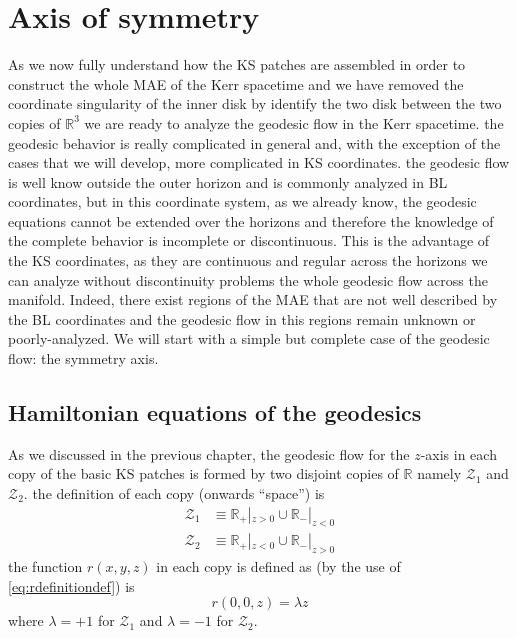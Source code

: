 \chapter{Axis of symmetry}\label{ch:dinamicsys} %

As we now fully understand how the \gls{KS} patches are assembled in order to construct the whole \gls{MAE} of the Kerr spacetime and we have removed the coordinate singularity of the inner disk by identify the two disk between the two copies of $\mathbb{R}^3$ we are ready to analyze the geodesic flow in the Kerr spacetime. the geodesic behavior is really complicated in general and, with the exception of the cases that we will develop, more complicated in \gls{KS} coordinates. the geodesic flow is well know outside the outer horizon and is commonly analyzed in \gls{BL} coordinates, but in this coordinate system, as we already know, the geodesic equations cannot be extended over the horizons and therefore the knowledge of the complete behavior is incomplete or discontinuous. This is the advantage of the \gls{KS} coordinates, as they are continuous and regular across the horizons we can analyze without discontinuity problems the whole geodesic flow across the manifold. Indeed, there exist regions of the \gls{MAE} that are not well described by the \gls{BL} coordinates and the geodesic flow in this regions remain unknown or poorly-analyzed. We will start with a simple but complete case of the geodesic flow: the symmetry axis.

\section{Hamiltonian equations of the geodesics}\label{Hamiltonianbon}

As we discussed in the previous chapter, the geodesic flow for the $z$-axis in each copy of the basic \gls{KS} patches is formed by two disjoint copies of $\mathbb{R}$ namely $\mathcal{Z}_1$ and $\mathcal{Z}_2$. the definition of each copy (onwards ``space'') is
\begin{align}
 \mathcal{Z}_1 &\equiv \mathbb{R}_+|_{z>0} \cup \mathbb{R}_-|_{z<0}\\
  \mathcal{Z}_2 &\equiv \mathbb{R}_+|_{z<0} \cup \mathbb{R}_-|_{z>0}
\end{align}
the function $r(x,y,z)$ in each copy is defined as (by the use of \cref{eq:rdefinitiondef}) is
\begin{equation}
 r(0,0,z)= \lambda z
\end{equation}
where $\lambda=+1$ for $\mathcal{Z}_1$ and $\lambda=-1$ for $\mathcal{Z}_2$.

